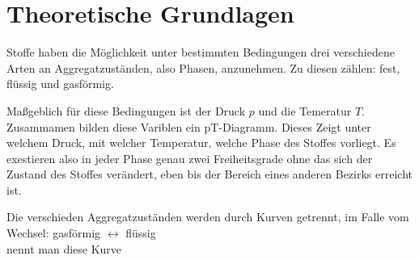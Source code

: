 \section{Theoretische Grundlagen}
Stoffe haben die Möglichkeit unter bestimmten Bedingungen drei verschiedene Arten an Aggregatzuständen, also Phasen, anzunehmen.
Zu diesen zählen: fest, flüssig und gasförmig.

Maßgeblich für diese Bedingungen ist der Druck $p$ und die Temeratur $T$.  Zusammamen bilden diese Variblen
ein pT-Diagramm. Dieses Zeigt unter welchem Druck, mit welcher Temperatur,  welche Phase des Stoffes vorliegt.
Es exestieren also in jeder Phase genau zwei Freiheitsgrade ohne das sich der Zustand des Stoffes verändert, eben bis der Bereich eines anderen Bezirks erreicht ist.



Die verschieden Aggregatzuständen werden durch Kurven getrennt, im Falle vom Wechsel: gasförmig $\longleftrightarrow$ flüssig \\
nennt man diese Kurve